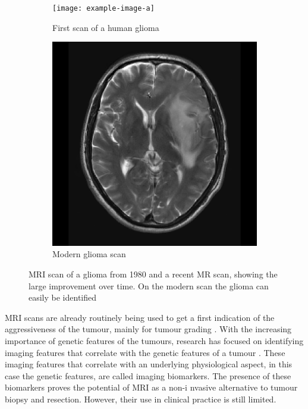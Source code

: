 \begin{figure}[hbt]
    \centering
    \begin{subfigure}[b]{0.45\textwidth}
        \centering
        \texttt{[image: example-image-a]}
        \caption{First scan of a human glioma}\label{fig:intro_MR_first}
    \end{subfigure}
    \begin{subfigure}[b]{0.45\textwidth}
        \centering
        \includegraphics[width=\textwidth]{Figures/T2_LGG.png}
        \caption{Modern glioma scan}\label{fig:intro_MR_modern}
    \end{subfigure}
    \caption{\acrshort{MRI} scan of a glioma from 1980 and a recent \acrshort{MR} scan, showing the large improvement over time. On the modern scan the glioma can easily be identified}\label{fig:intro_MR_example}
\end{figure}

\gls{MRI} scans are already routinely being used to get a first indication of the aggressiveness of the tumour, mainly for tumour grading \autocite{upadhyay2011MRIevaluation}.
With the increasing importance of genetic features of the tumours, research has focused on identifying imaging features that correlate with the genetic features of a tumour \autocite{patel2017mismatch, smits2016imaging}.
These imaging features that correlate with an underlying physiological aspect, in this case the genetic features, are called imaging biomarkers.
The presence of these biomarkers proves the potential of \gls{MRI} as a non-i nvasive alternative to tumour biopsy and resection.
However, their use in clinical practice is still limited.

